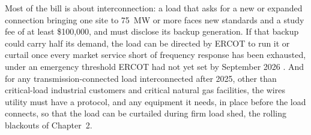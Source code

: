 Most of the bill is about interconnection: a load that asks for a new or expanded connection bringing one site to 75~MW or more faces new standards and a study fee of at least \$100,000, and must disclose its backup generation. If that backup could carry half its demand, the load can be directed by ERCOT to run it or curtail once every market service short of frequency response has been exhausted, under an emergency threshold ERCOT had not yet set by September 2026 \autocite{puct2026order58481,ercot2026sb6status}. And for any transmission-connected load interconnected after 2025, other than critical-load industrial customers and critical natural gas facilities, the wires utility must have a protocol, and any equipment it needs, in place before the load connects, so that the load can be curtailed during firm load shed, the rolling blackouts of Chapter~2. %

